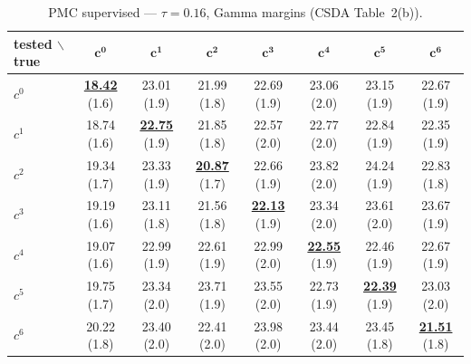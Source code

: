 \begin{table}[htbp]
  \centering
  \small
  \setlength{\tabcolsep}{4pt}
  \caption{PMC supervised — $\tau = 0.16$, Gamma margins (CSDA Table~2(b)).}
  \label{tab:exp1-low_tau_gamma}
  \begin{tabular}{lccccccc}
    \toprule
    tested $\backslash$ true & $\mathbf{c^{0}}$ & $\mathbf{c^{1}}$ & $\mathbf{c^{2}}$ & $\mathbf{c^{3}}$ & $\mathbf{c^{4}}$ & $\mathbf{c^{5}}$ & $\mathbf{c^{6}}$ \\
    \midrule
    $c^{0}$ & \textbf{\underline{18.42}} (1.6) & 23.01 (1.9) & 21.99 (1.8) & 22.69 (1.9) & 23.06 (2.0) & 23.15 (1.9) & 22.67 (1.9) \\
    $c^{1}$ & 18.74 (1.6) & \textbf{\underline{22.75}} (1.9) & 21.85 (1.8) & 22.57 (2.0) & 22.77 (2.0) & 22.84 (1.9) & 22.35 (1.9) \\
    $c^{2}$ & 19.34 (1.7) & 23.33 (1.9) & \textbf{\underline{20.87}} (1.7) & 22.66 (1.9) & 23.82 (2.0) & 24.24 (1.9) & 22.83 (1.8) \\
    $c^{3}$ & 19.19 (1.6) & 23.11 (1.8) & 21.56 (1.8) & \textbf{\underline{22.13}} (1.9) & 23.34 (2.0) & 23.61 (2.0) & 23.67 (1.9) \\
    $c^{4}$ & 19.07 (1.6) & 22.99 (1.9) & 22.61 (1.9) & 22.99 (2.0) & \textbf{\underline{22.55}} (1.9) & 22.46 (1.9) & 22.67 (1.9) \\
    $c^{5}$ & 19.75 (1.7) & 23.34 (2.0) & 23.71 (1.9) & 23.55 (2.0) & 22.73 (1.9) & \textbf{\underline{22.39}} (1.9) & 23.03 (2.0) \\
    $c^{6}$ & 20.22 (1.8) & 23.40 (2.0) & 22.41 (2.0) & 23.98 (2.0) & 23.44 (2.0) & 23.45 (1.8) & \textbf{\underline{21.51}} (1.8) \\
    \bottomrule
  \end{tabular}
\end{table}
